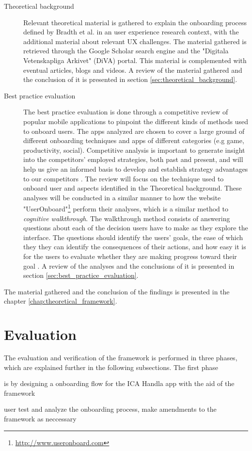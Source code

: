 \begin{description}
  \item [Theoretical background] Relevant theoretical material is gathered to explain the onboarding process defined by Bradth et al. \cite{Bradt2009} in an user experience research context, with the additional material about relevant UX challenges. The material gathered is retrieved through the Google Scholar search engine and the "Digitala Vetenskapliga Arkivet" (DiVA) portal. This material is complemented with eventual articles, blogs and videos. A review of the material gathered and the conclusion of it is presented in section \ref{sec:theoretical_background}.
  \item [Best practice evaluation] The best practice evaluation is done through a competitive review \cite{Schade2013} of popular mobile applications to pinpoint the different kinds of methods used to onboard users. The apps analyzed are chosen to cover a large ground of different onboarding techniques and apps of different categories (e.g game, productivity, social). Competitive analysis is important to generate insight into the competitors' employed strategies, both past and present, and will help us give an informed basis to develop and establish strategy advantages to our competitors \cite{Wilson2010}. The review will focus on the technique used to onboard user and aspects identified in the Theoretical background. These analyses will be conducted in a similar manner to how the website "UserOnboard"\footnote{\url{http://www.useronboard.com}} perform their analyses, which is a similar method to \textit{cognitive walkthrough}. The walkthrough method consists of answering questions about each of the decision users have to make as they explore the interface. The questions should identify the users' goals, the ease of which they they can identify the consequences of their actions, and how easy it is for the users to evaluate whether they are making progress toward their goal \cite{Lewis1990}. A review of the analyses and the conclusions of it is presented in section \ref{sec:best_practice_evaluation}.
\end{description}
The material gathered and the conclusion of the findings is presented in the chapter \ref{chap:theoretical_framework}.

\section{Evaluation}
\label{sec:evaluation}
The evaluation and verification of the framework is performed in three phases, which are explained further in the following subsections. The first phase \begin{enumerate*}[label=(\(\arabic*\))]
  \item is by designing a onboarding flow for the ICA Handla app with the aid of the framework
  \item user test and analyze the onboarding process, make amendments to the framework as neccessary
\end{enumerate*}

